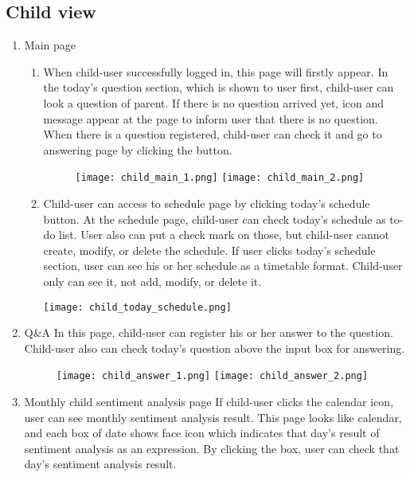 \documentclass[conference]{IEEEtran}
\begin{document}
        \subsection{Child view}
        \begin{enumerate}
            \item Main page
            
            \begin{enumerate}
                \item When child-user successfully logged in, this page will firstly appear. In the today’s question section, which is shown to user first, child-user can look a question of parent. If there is no question arrived yet, icon and message appear at the page to inform user that there is no question. When there is a question registered, child-user can check it and go to answering page by clicking the button.
                \begin{figure}[H]
                 \centering
                 \texttt{[image: child\_main\_1.png]}
                 \texttt{[image: child\_main\_2.png]}
                 \end{figure}
                \item  Child-user can access to schedule page by clicking today’s schedule button. At the schedule page, child-user can check today’s schedule as to-do list. User also can put a check mark on those, but child-user cannot create, modify, or delete the schedule. If user clicks today’s schedule section, user can see his or her schedule as a timetable format. Child-user only can see it, not add, modify, or delete it.
                 
                 \centering
                 \texttt{[image: child\_today\_schedule.png]}
                 
            \end{enumerate}
            \item Q\&A \hfill\break
            In this page, child-user can register his or her answer to the question. Child-user also can check today’s question above the input box for answering.
            \begin{figure}[H]
                 \centering
                 \texttt{[image: child\_answer\_1.png]}
                 \texttt{[image: child\_answer\_2.png]}
                 \end{figure}
            \item Monthly child sentiment analysis page \hfill \break
            If child-user clicks the calendar icon, user can see monthly sentiment analysis result. This page looks like calendar, and each box of date shows face icon which indicates that day’s result of sentiment analysis as an expression. By clicking the box, user can check that day’s sentiment analysis result.
        \end{enumerate}
\end{document}
